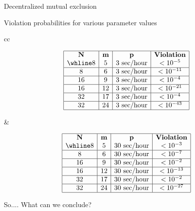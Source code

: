 \begin{slide}{Decentralized mutual exclusion}
  \begin{block}{Violation probabilities for various parameter values}
    \begin{center}
      \small\footnotesize
      \renewcommand{\arraystretch}{1.1}
      \begin{tabular}{cc}
        \begin{minipage}{0.4\textwidth}
          \[
          \begin{array}{|c|c|c|c|}\hline
            \mathbf{N}  & \mathbf{m} & \mathbf{p}        & \mbox{\textbf{Violation}} \\ \whline
            8           & 5          & \mbox{3 sec/hour} & < 10^{-5} \\ \hline
            8           & 6          & \mbox{3 sec/hour} & < 10^{-11} \\ \hline
            16          & 9          & \mbox{3 sec/hour} & < 10^{-4} \\ \hline
            16          & 12         & \mbox{3 sec/hour} & < 10^{-21} \\ \hline
            32          & 17         & \mbox{3 sec/hour} & < 10^{-4} \\ \hline
            32          & 24         & \mbox{3 sec/hour} & < 10^{-43} \\ \hline
          \end{array}
          \]
        \end{minipage} &
        \begin{minipage}{0.4\textwidth}
          \[
          \begin{array}{|c|c|c|c|}\hline
            \mathbf{N}  & \mathbf{m} & \mathbf{p}        & \mbox{\textbf{Violation}} \\ \whline
            8           & 5          & \mbox{30 sec/hour} & < 10^{-3} \\ \hline
            8           & 6          & \mbox{30 sec/hour} & < 10^{-7} \\ \hline
            16          & 9          & \mbox{30 sec/hour} & < 10^{-2} \\ \hline
            16          & 12         & \mbox{30 sec/hour} & < 10^{-13} \\ \hline
            32          & 17         & \mbox{30 sec/hour} & < 10^{-2} \\ \hline
            32          & 24         & \mbox{30 sec/hour} & < 10^{-27} \\ \hline
          \end{array}
          \]
        \end{minipage} 
      \end{tabular}
    \end{center}
  \end{block}
  \begin{alertblock}{So....}
    What can we conclude?
  \end{alertblock}
\end{slide}
